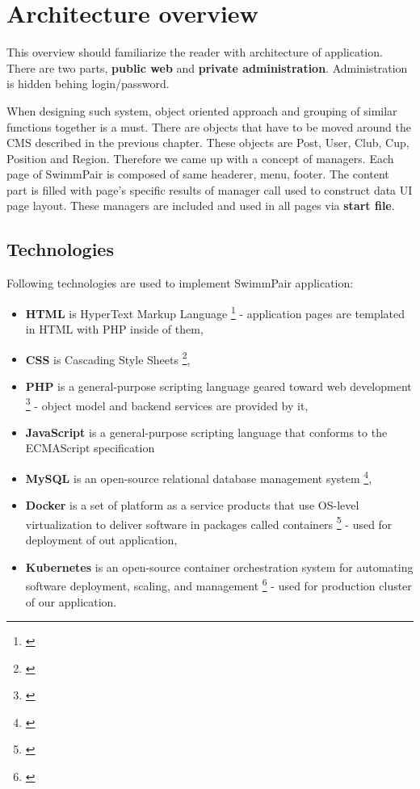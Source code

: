 \chapter{Architecture overview}
This overview should familiarize the reader with architecture of application. There are two parts, \textbf{public web} and \textbf{private administration}. Administration is hidden behing login/password. 
\par
When designing such system, object oriented approach and grouping of similar functions together is a must. There are objects that have to be moved around the CMS described in the previous chapter. These objects are Post, User, Club, Cup, Position and Region. Therefore we came up with a concept of managers. Each page of SwimmPair is composed of same headerer, menu, footer. The content part is filled with page's specific results of manager call used to construct data UI page layout. These managers are included and used in all pages via \textbf{start file}.
\section{Technologies}
Following technologies are used to implement SwimmPair application:
\begin{itemize}
    \item \textbf{HTML} is HyperText Markup Language \footnote{\citep{HTML5Standard}} - application pages are templated in HTML with PHP inside of them,
    \item \textbf{CSS} is Cascading Style Sheets \footnote{\citep{CSS3Standard}},
    \item \textbf{PHP} is a general-purpose scripting language geared toward web development \footnote{\citep{PHP74Standard}} - object model and backend services are provided by it,
    \item \textbf{JavaScript}  is a general-purpose scripting language that conforms to the ECMAScript specification
    \item \textbf{MySQL} is an open-source relational database management system \footnote{\citep{MySQLDocu}},
    \item \textbf{Docker} is a set of platform as a service products that use OS-level virtualization to deliver software in packages called containers \footnote{\citep{DockerDocu}} - used for deployment of out application,
    \item \textbf{Kubernetes} is an open-source container orchestration system for automating software deployment, scaling, and management \footnote{\citep{K8sDocu}} - used for production cluster of our application.
\end{itemize} 
